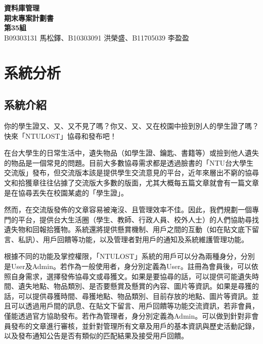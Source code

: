\documentclass[12pt,a4paper]{article}
\begin{document}
\title{}
\author{}
\date{}

\begin{center}
\textbf{\Large 資料庫管理\\
期末專案計劃書 \\[.5cm]
第35組 } \\[10pt]
B09303131 馬松鐸、B10303091 洪榮盛、B11705039 李盈盈
\end{center}


\section{系統分析}

\subsection{系統介紹}

你的學生證又、又、又不見了嗎？你又、又、又在校園中撿到別人的學生證了嗎？快來「NTULOST」協尋和發布吧！

在台大學生的日常生活中，遺失物品（如學生證、鑰匙、書籍等）或撿到他人遺失的物品是一個常見的問題。目前大多數協尋需求都是透過臉書的「NTU台大學生交流版」發布，但交流版本該是提供學生交流意見的平台，近年來層出不窮的協尋文和拾獲章往往佔據了交流版大多數的版面，尤其大概每五篇文章就會有一篇文章是在協尋丟失在校園某處的「學生證」。

然而，在交流版發佈的文章容易被淹沒、且管理效率不佳。因此，我們規劃一個專門的平台，提供台大生活圈（學生、教師、行政人員、校外人士）的人們協助尋找遺失物和回報拾獲物。系統還將提供懸賞機制、用戶之間的互動（如在貼文底下留言、私訊）、用戶回饋等功能，以及管理者對用戶的通知及系統維護管理功能。

根據不同的功能及掌控權限，「NTULOST」系統的用戶可以分為兩種身分，分別是User及Admin。若作為一般使用者，身分別定義為User。註冊為會員後，可以依照自身需求，選擇發佈協尋文或尋獲文。如果是要協尋的話，可以提供可能遺失時間、遺失地點、物品類別、是否要懸賞及懸賞的內容、圖片等資訊。如果是尋獲的話，可以提供尋獲時間、尋獲地點、物品類別、目前存放的地點、圖片等資訊。並且可以透過用戶間的訊息、在貼文下留言、用戶回饋等功能交流資訊，若非會員，僅能透過官方協助發布。若作為管理者，身分別定義為Admin。可以做到針對非會員發布的文章進行審核，並針對管理所有文章及用戶的基本資訊與歷史活動記錄，以及發布通知公告是否有類似的匹配結果及接受用戶回饋。
\end{document}
